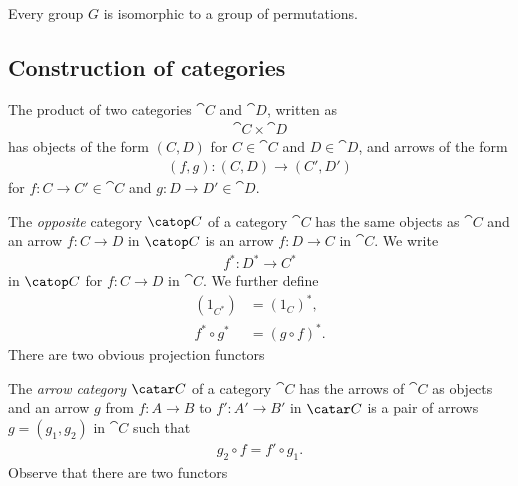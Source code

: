 \documentclass{article}
\begin{document}
\begin{theorem}[Cayley]
    Every group $G$ is isomorphic to a group of permutations.
\end{theorem}



\subsection{Construction of categories}

\begin{definition}
    The product of two categories $\cat{C}$ and $\cat{D}$, written
    as
    \begin{align*}
        \cat{C}\times\cat{D}
    \end{align*} 
    has objects of the form $(C,D)$ for $C\in\cat{C}$ and $D\in\cat{D}$,
    and arrows of the form
    \begin{align*}
        (f,g):(C,D)\to (C',D')
    \end{align*}
    for $f:C\to C'\in\cat{C}$ and $g:D\to D'\in\cat{D}$.
\end{definition}

\begin{definition}
    The \emph{opposite} category $\catop C$ of a category $\cat C$ has
    the same objects as $\cat C$ and an arrow $f:C\to D$ in $\catop C$
    is an arrow $f:D\to C$ in $\cat C$. We write
    \begin{align*}
        f^* : D^* \to C^*
    \end{align*} 
    in $\catop C$ for $f:C\to D$ in $\cat C$. We further define
    \begin{align*}
         (1_{C^*}) &= (1_C)^*,\\ 
         f^*\circ g^*&= (g\circ f)^*.
    \end{align*}
    There are two obvious projection functors
    \begin{center}
    \end{center}
\end{definition}

\begin{definition}
    The \emph{arrow category} $\catar C$ of a category $\cat C$
    has the arrows of $\cat C$ as objects and an arrow $g$ from
    $f:A\to B$ to $f':A'\to B'$ in $\catar C$ is a pair of arrows
    $g=(g_1, g_2)$ in $\cat C$ such that 
    \begin{align*}
        g_2\circ f = f'\circ g_1.
    \end{align*}
    Observe that there are two functors
    \begin{center}
    \end{center}
\end{definition}
\end{document}
